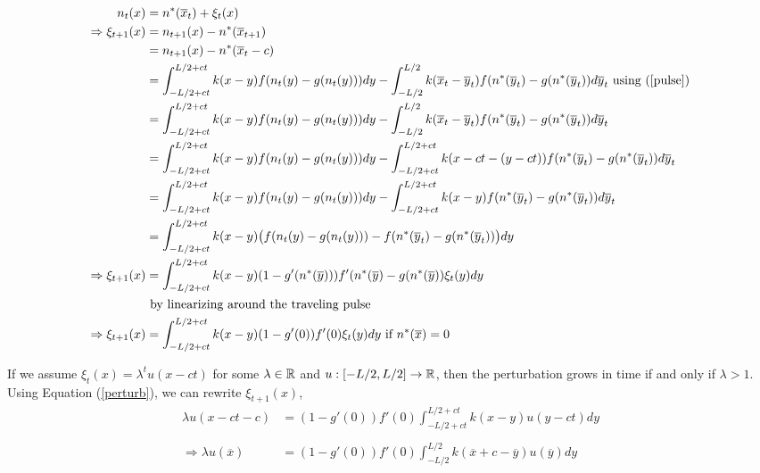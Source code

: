 \documentclass[12pt,english]{article}
\begin{document}
\begin{align}
n_t(x)&=n^*(\overline{x}_t)+\xi_t(x) \notag
\\ \Rightarrow \xi_{t+1}(x)&=n_{t+1}(x)-n^*(\overline{x}_{t+1}) \notag
\\&=n_{t+1}(x)-n^*(\overline{x}_{t}-c) \notag
\\ &=\int_{-L/2+ct}^{L/2+ct}k(x-y)f(n_t(y)-g(n_t(y)))dy-\int_{-L/2}^{L/2}k(\overline{x}_{t}-\overline{y}_t)f(n^*(\overline{y}_t)-g(n^*(\overline{y}_t))d\overline y_t \text{ using (\ref{pulse})} \notag
\\ &=\int_{-L/2+ct}^{L/2+ct}k(x-y)f(n_t(y)-g(n_t(y)))dy-\int_{-L/2}^{L/2}k(\overline{x}_{t}-\overline{y}_t)f(n^*(\overline{y}_t)-g(n^*(\overline{y}_t))d\overline y_t \notag
\\ &=\int_{-L/2+ct}^{L/2+ct}k(x-y)f(n_t(y)-g(n_t(y)))dy-\int_{-L/2+ct}^{L/2+ct}k(x-ct-(y-ct))f(n^*(\overline{y}_t)-g(n^*(\overline{y}_t))d\overline y_t \notag
\\ &=\int_{-L/2+ct}^{L/2+ct}k(x-y)f(n_t(y)-g(n_t(y)))dy-\int_{-L/2+ct}^{L/2+ct}k(x-y)f(n^*(\overline{y}_t)-g(n^*(\overline{y}_t))d\overline y_t \notag
\\ &=\int_{-L/2+ct}^{L/2+ct}k(x-y)\big(f(n_t(y)-g(n_t(y)))-f(n^*(\overline{y}_t)-g(n^*(\overline{y}_t))\big)dy \notag
\\ \Rightarrow \xi_{t+1}(x)&=\int_{-L/2+ct}^{L/2+ct}k(x-y)(1-g'(n^*(\overline{y})))f'(n^*(\overline{y})-g(n^*(\overline{y}))\xi_t(y)dy \notag
\\& \text{ by linearizing around the traveling pulse} \notag
\\ \Rightarrow \xi_{t+1}(x)&=\int_{-L/2+ct}^{L/2+ct}k(x-y)(1-g'(0))f'(0)\xi_t(y)dy \text{ if $n^*(\overline{x})=0$} \label{perturb}
\end{align}


If we assume $\xi_t(x)=\lambda^tu(x-ct)$ for some $\lambda\in{\mathbb{R}}$ and $u:[-L/2,L/2]\to{\mathbb{R}}$, then the perturbation grows in time if and only if $\lambda >1$.  Using Equation (\ref{perturb}), we can rewrite $\xi_{t+1}(x)$,
\begin{align*}
\lambda u(x-ct-c)&=(1-g'(0))f'(0)\int_{-L/2+ct}^{L/2+ct}k(x-y)u(y-ct)dy
\\ \\\Rightarrow \lambda u(\overline{x})&=(1-g'(0))f'(0)\int_{-L/2}^{L/2}k(\overline{x}+c-\overline{y})u(\overline{y})dy
\end{align*}
\end{document}
